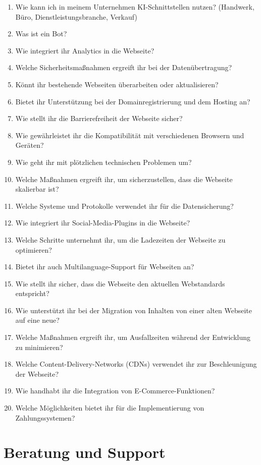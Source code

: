 \documentclass[a4paper,12pt]{article}
\begin{document}
\begin{enumerate}[resume]
    \item Wie kann ich in meinem Unternehmen KI-Schnittstellen nutzen? (Handwerk, Büro, Dienstleistungsbranche, Verkauf)
    \item Was ist ein Bot?
    \item Wie integriert ihr Analytics in die Webseite?
    \item Welche Sicherheitsmaßnahmen ergreift ihr bei der Datenübertragung?
    \item Könnt ihr bestehende Webseiten überarbeiten oder aktualisieren?
    \item Bietet ihr Unterstützung bei der Domainregistrierung und dem Hosting an?
    \item Wie stellt ihr die Barrierefreiheit der Webseite sicher?
    \item Wie gewährleistet ihr die Kompatibilität mit verschiedenen Browsern und Geräten?
    \item Wie geht ihr mit plötzlichen technischen Problemen um?
    \item Welche Maßnahmen ergreift ihr, um sicherzustellen, dass die Webseite skalierbar ist?
    \item Welche Systeme und Protokolle verwendet ihr für die Datensicherung?
    \item Wie integriert ihr Social-Media-Plugins in die Webseite?
    \item Welche Schritte unternehmt ihr, um die Ladezeiten der Webseite zu optimieren?
    \item Bietet ihr auch Multilanguage-Support für Webseiten an?
    \item Wie stellt ihr sicher, dass die Webseite den aktuellen Webstandards entspricht?
    \item Wie unterstützt ihr bei der Migration von Inhalten von einer alten Webseite auf eine neue?
    \item Welche Maßnahmen ergreift ihr, um Ausfallzeiten während der Entwicklung zu minimieren?
    \item Welche Content-Delivery-Networks (CDNs) verwendet ihr zur Beschleunigung der Webseite?
    \item Wie handhabt ihr die Integration von E-Commerce-Funktionen?
    \item Welche Möglichkeiten bietet ihr für die Implementierung von Zahlungssystemen?
\end{enumerate}

\section*{Beratung und Support}
\end{document}
